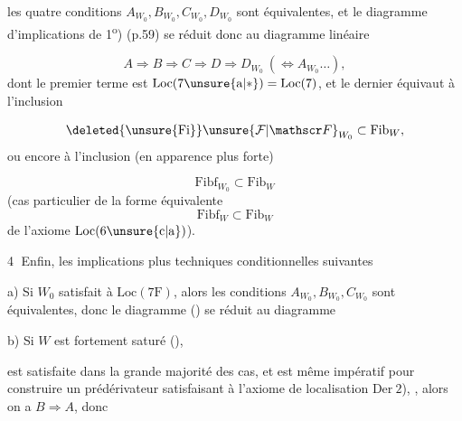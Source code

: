 les quatre conditions $A_{W_0},B_{W_0},C_{W_0},D_{W_0}$ sont équivalentes, et le diagramme d'implications de 1\textsuperscript{o}) (p.59) se réduit donc au diagramme linéaire

\[
 A\Rightarrow B\Longrightarrow C\Longrightarrow D\Longrightarrow D_{W_0}\ (\Leftrightarrow A_{W_0}\ldots),
\]
dont le premier terme  est $\mathrm{Loc}(7\unsure{\mathrm a|*})=\mathrm{Loc}(7)$, et le dernier équivaut à l'inclusion

\[
 \deleted{\unsure{\mathrm{Fi}}}\unsure{\mathcal F|\mathscr F}_{W_0}\subset\mathrm{Fib}_W,
\]
 ou encore à l'inclusion (en apparence plus forte)

\[
 \mathrm{Fibf}_{W_0}\subset\mathrm{Fib}_W
\]
(cas particulier de la forme équivalente
\[
 \mathrm{Fibf}_W\subset\mathrm{Fib}_W
\]
de l'axiome $\mathrm{Loc}(6\unsure{\mathrm c|\mathrm a})$).

\textcircled{4} Enfin,  les implications plus techniques conditionnelles suivantes

a) Si $W_0$ satisfait à $\mathrm{Loc}(7\mathrm F)$, alors les conditions $A_{W_0},B_{W_0},C_{W_0}$ sont équivalentes, donc le diagramme () se réduit au diagramme

b) Si $W$ est fortement saturé (), 

est satisfaite dans la grande majorité des cas, et est même impératif pour construire un prédérivateur satisfaisant à l'axiome de localisation $\mathrm{Der}\ 2$), , alors on a $B\Rightarrow A$,  donc

